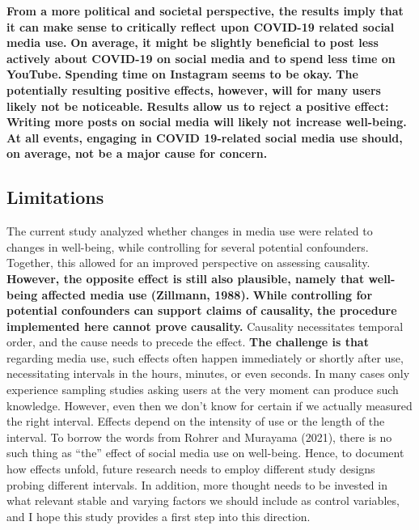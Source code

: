 \documentclass[
  man,mask]{apa7}
\begin{document}
\textbf{From a more political and societal perspective, the results imply that it can make sense to critically reflect upon COVID-19 related social media use.}
\textbf{On average, it might be slightly beneficial to post less actively about COVID-19 on social media and to spend less time on YouTube.}
\textbf{Spending time on Instagram seems to be okay.}
\textbf{The potentially resulting positive effects, however, will for many users likely not be noticeable.}
\textbf{Results allow us to reject a positive effect: Writing more posts on social media will likely not increase well-being.}
\textbf{At all events, engaging in COVID 19-related social media use should, on average, not be a major cause for concern.}

\hypertarget{limitations}{%
\subsection{Limitations}\label{limitations}}

The current study analyzed whether changes in media use were related to changes in well-being, while controlling for several potential confounders.
Together, this allowed for an improved perspective on assessing causality.
\textbf{However, the opposite effect is still also plausible, namely that well-being affected media use (Zillmann, 1988).}
\textbf{While controlling for potential confounders can support claims of causality, the procedure implemented here cannot prove causality.}
Causality necessitates temporal order, and the cause needs to precede the effect.
\textbf{The challenge is that} regarding media use, such effects often happen immediately or shortly after use, necessitating intervals in the hours, minutes, or even seconds.
In many cases only experience sampling studies asking users at the very moment can produce such knowledge.
However, even then we don't know for certain if we actually measured the right interval.
Effects depend on the intensity of use or the length of the interval.
To borrow the words from Rohrer and Murayama (2021), there is no such thing as ``the'' effect of social media use on well-being.
Hence, to document how effects unfold, future research needs to employ different study designs probing different intervals.
In addition, more thought needs to be invested in what relevant stable and varying factors we should include as control variables, and I hope this study provides a first step into this direction.
\end{document}
